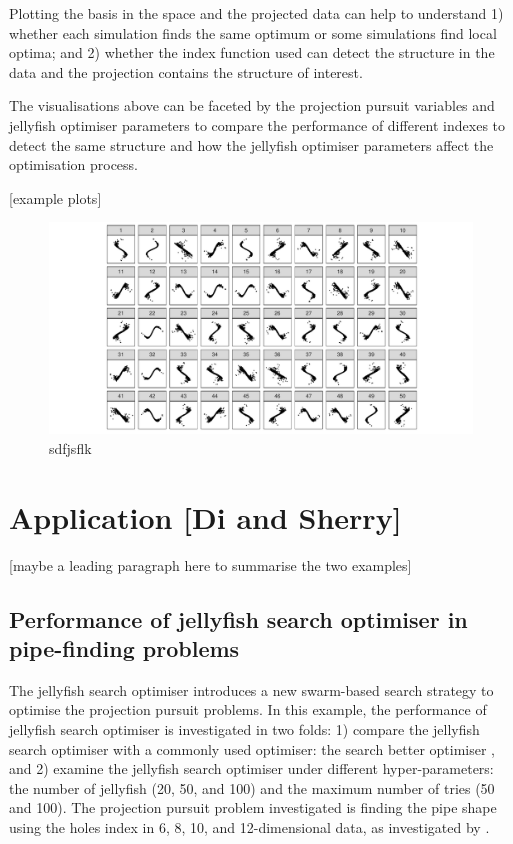 \documentclass[
  number,
  preprint,
  3p]{elsarticle}
\begin{document}
Plotting the basis in the space and the projected data can help to
understand 1) whether each simulation finds the same optimum or some
simulations find local optima; and 2) whether the index function used
can detect the structure in the data and the projection contains the
structure of interest.

The visualisations above can be faceted by the projection pursuit
variables and jellyfish optimiser parameters to compare the performance
of different indexes to detect the same structure and how the jellyfish
optimiser parameters affect the optimisation process.

{[}example plots{]}

\begin{figure}[H]

{\centering \includegraphics{optim_files/figure-pdf/unnamed-chunk-4-1.pdf}

}

\caption{sdfjsflk}

\end{figure}%

\section{Application {[}Di and Sherry{]}}\label{sec-simulation}

{[}maybe a leading paragraph here to summarise the two examples{]}

\subsection{Performance of jellyfish search optimiser in pipe-finding
problems}\label{performance-of-jellyfish-search-optimiser-in-pipe-finding-problems}

The jellyfish search optimiser introduces a new swarm-based search
strategy to optimise the projection pursuit problems. In this example,
the performance of jellyfish search optimiser is investigated in two
folds: 1) compare the jellyfish search optimiser with a commonly used
optimiser: the search better optimiser
\citep{RJ-2021-105, laa_using_2020}, and 2) examine the jellyfish search
optimiser under different hyper-parameters: the number of jellyfish (20,
50, and 100) and the maximum number of tries (50 and 100). The
projection pursuit problem investigated is finding the pipe shape using
the holes index in 6, 8, 10, and 12-dimensional data, as investigated by
\citet{laa_using_2020}.
\end{document}
